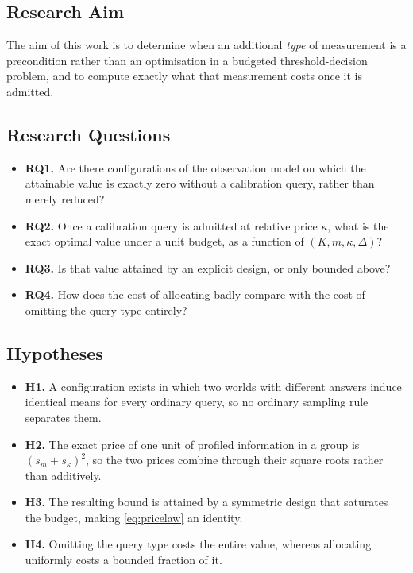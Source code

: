 \subsection{Research Aim}

The aim of this work is to determine when an additional \emph{type} of measurement is a
precondition rather than an optimisation in a budgeted threshold-decision problem, and to
compute exactly what that measurement costs once it is admitted.

\subsection{Research Questions}

\begin{itemize}
\item \textbf{RQ1.} Are there configurations of the observation model on which the
attainable value is exactly zero without a calibration query, rather than merely reduced?
\item \textbf{RQ2.} Once a calibration query is admitted at relative price $\kappa$, what is
the exact optimal value under a unit budget, as a function of $(K,m,\kappa,\Delta)$?
\item \textbf{RQ3.} Is that value attained by an explicit design, or only bounded above?
\item \textbf{RQ4.} How does the cost of allocating badly compare with the cost of omitting
the query type entirely?
\end{itemize}

\subsection{Hypotheses}

\begin{itemize}
\item \textbf{H1.} A configuration exists in which two worlds with different answers induce
identical means for every ordinary query, so no ordinary sampling rule separates them.
\item \textbf{H2.} The exact price of one unit of profiled information in a group is
$(s_{m}+s_{\kappa})^{2}$, so the two prices combine through their square roots rather
than additively.
\item \textbf{H3.} The resulting bound is attained by a symmetric design that saturates the
budget, making \eqref{eq:pricelaw} an identity.
\item \textbf{H4.} Omitting the query type costs the entire value, whereas allocating
uniformly costs a bounded fraction of it.
\end{itemize}

